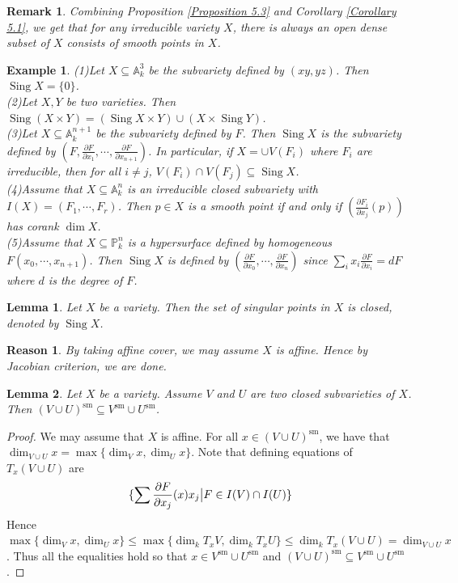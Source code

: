 \documentclass{ctexart}
\newtheorem{remark}{Remark}[section]
\newtheorem{lemma}{Lemma}[section]
\newtheorem{reason}{Reason}[section]
\newtheorem{example}{Example}[section]
\newcommand{\singular}{\operatorname{Sing}}
\newcommand{\smooth}{\operatorname{sm}}
\begin{document}
\begin{remark}
    Combining Proposition \ref{Proposition 5.3} and Corollary \ref{Corollary 5.1},
    we get that for any irreducible variety $X$, there is always an open dense subset of $X$ consists of smooth points in $X$.
\end{remark}
\begin{example}
    (1)Let $X \subseteq \mathbb{A}_{k}^{3}$ be the subvariety defined by $(xy, yz)$.
    Then $\singular X = \{0\}$. \\
    (2)Let $X, Y$ be two varieties.
    Then $\singular (X \times Y) = (\singular X \times Y) \cup (X \times \singular Y)$. \\
    (3)Let $X \subseteq \mathbb{A}_{k}^{n + 1}$ be the subvariety defined by $F$.
    Then $\singular X$ is the subvariety defined by $(F, \frac{\partial F}{\partial x_{1}}, \cdots, \frac{\partial F}{\partial x_{n + 1}})$.
    In particular, if $X = \cup V(F_{i})$ where $F_{i}$ are irreducible,
    then for all $i \neq j$, $V(F_{i}) \cap V(F_{j}) \subseteq \singular X$. \\
    (4)Assume that $X \subseteq \mathbb{A}_{k}^{n}$ is an irreducible closed subvariety with $I(X) = (F_{1}, \cdots, F_{r})$.
    Then $p\in X$ is a smooth point if and only if $(\frac{\partial F_{i}}{\partial x_{j}}(p))$ has corank $\dim X$. \\
    (5)Assume that $X \subseteq \mathbb{P}_{k}^{n}$ is a hypersurface defined by homogeneous $F(x_{0}, \cdots, x_{n + 1})$.
    Then $\singular X$ is defined by $(\frac{\partial F}{\partial x_{0}}, \cdots, \frac{\partial F}{\partial x_{n}})$ since $\sum_{i} x_{i}\frac{\partial F}{\partial x_{i}} = dF$ where $d$ is the degree of $F$. 
\end{example}
\begin{lemma}
    Let $X$ be a variety.
    Then the set of singular points in $X$ is closed, denoted by $\singular X$.
    \label{Lemma 5.1}
\end{lemma}
\begin{reason}
    By taking affine cover, we may assume $X$ is affine.
    Hence by Jacobian criterion, we are done.
\end{reason}
\begin{lemma}
    Let $X$ be a variety.
    Assume $V$ and $U$ are two closed subvarieties of $X$.
    Then $(V \cup U)^{\smooth} \subseteq V^{\smooth} \cup U^{\smooth}$.
    \label{Lemma 5.2}
\end{lemma}
\begin{proof}
    We may assume that $X$ is affine.
    For all $x\in (V \cup U)^{\smooth}$, we have that $\dim_{V \cup U} x = \max \{\dim_{V} x, \dim_{U} x\}$.
    Note that defining equations of $T_{x}(V \cup U)$ are
    \begin{equation}
        \{\sum \frac{\partial F}{\partial x_{j}}(x)x_{j} \big{|} F\in I(V) \cap I(U)\}
    \end{equation}
    Hence $\max \{\dim_{V} x, \dim_{U} x\} \le \max \{\dim_{k} T_{x}V, \dim_{k} T_{x}U\} \le \dim_{k} T_{x}(V \cup U) = \dim_{V \cup U} x$.
    Thus all the equalities hold so that $x\in V^{\smooth} \cup U^{\smooth}$ and $(V \cup U)^{\smooth} \subseteq V^{\smooth} \cup U^{\smooth}$.
\end{proof}
\end{document}
